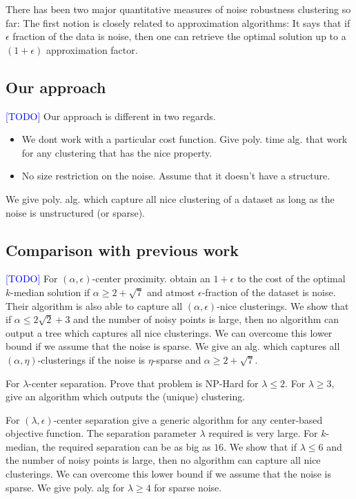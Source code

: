 \documentclass[anon,12pt]{colt2016} %
\newcommand{\todo}{\textcolor{blue}{[TODO]}\xspace}
\begin{document}
There has been two major quantitative measures of noise robustness clustering so far: The first notion is closely related to approximation algorithms: It says that if $\epsilon$ fraction of the data is noise, then one can retrieve the optimal solution up to a $(1+\epsilon)$ approximation factor.  

\subsection{Our approach}
\todo Our approach is different in two regards.
\begin{itemize}[nolistsep]
\item We dont work with a particular cost function. Give poly. time alg.  that work for any clustering that has the nice property.
\item No size restriction on the noise. Assume that it doesn't have a structure. 
\end{itemize}
We give poly. alg. which capture all nice clustering of a dataset as long as the noise is unstructured (or sparse).

\subsection{Comparison with previous work}
\todo For $(\alpha, \epsilon)$-center proximity. \cite{balcan2012clustering} obtain an $1+\epsilon$ to the cost of the optimal $k$-median solution if $\alpha \ge 2+\sqrt{7}$ and atmost $\epsilon$-fraction of the dataset is noise. Their algorithm is also able to capture all $(\alpha, \epsilon)$-nice clusterings. We show that if $\alpha \le 2\sqrt{2} + 3$ and the number of noisy points is large, then no algorithm can output a tree which captures all nice clusterings. We can overcome this lower bound if we assume that the noise is sparse. We give an alg. which captures all $(\alpha, \eta)$-clusterings if the noise is $\eta$-sparse and $\alpha \ge 2+\sqrt{7}$.

For $\lambda$-center separation. Prove that problem is NP-Hard for $\lambda \le 2$. For $\lambda \ge 3$, give an algorithm which outputs the (unique) clustering.

For $(\lambda, \epsilon)$-center separation \cite{ben2014clustering} give a generic algorithm for any center-based objective function. The separation parameter $\lambda$ required is very large. For $k$-median, the required separation can be as big as $16$. We show that if $\lambda \le 6$ and the number of noisy points is large, then no algorithm can capture all nice clusterings. We can overcome this lower bound if we assume that the noise is sparse. We give poly. alg for $\lambda \ge 4$ for sparse noise.
\end{document}
